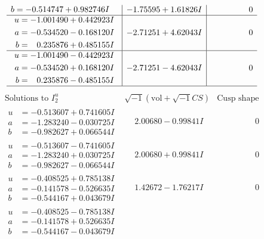 \documentclass[1p]{elsarticle_modified}
\theoremstyle{definition}
\newcommand{\I}{\sqrt{-1}}
\begin{document}
$$\begin{array}{c|c|c}
\begin{aligned}
b &= -0.514747 + 0.982746 I\end{aligned}
 & -1.75595 + 1.61826 I & \phantom{-0.000000 } 0 \\ \hline\begin{aligned}
u &= -1.001490 + 0.442923 I \\
a &= -0.534520 - 0.168120 I \\
b &= \phantom{-}0.235876 + 0.485155 I\end{aligned}
 & -2.71251 + 4.62043 I & \phantom{-0.000000 } 0 \\ \hline\begin{aligned}
u &= -1.001490 - 0.442923 I \\
a &= -0.534520 + 0.168120 I \\
b &= \phantom{-}0.235876 - 0.485155 I\end{aligned}
 & -2.71251 - 4.62043 I & \phantom{-0.000000 } 0\\
 \hline 
 \end{array}$$\newpage$$\begin{array}{c|c|c}  
\text{Solutions to }I^u_{2}& \I (\text{vol} + \sqrt{-1}CS) & \text{Cusp shape}\\
 \hline 
\begin{aligned}
u &= -0.513607 + 0.741605 I \\
a &= -1.283240 - 0.030725 I \\
b &= -0.982627 + 0.066544 I\end{aligned}
 & \phantom{-}2.00680 - 0.99841 I & \phantom{-0.000000 } 0 \\ \hline\begin{aligned}
u &= -0.513607 - 0.741605 I \\
a &= -1.283240 + 0.030725 I \\
b &= -0.982627 - 0.066544 I\end{aligned}
 & \phantom{-}2.00680 + 0.99841 I & \phantom{-0.000000 } 0 \\ \hline\begin{aligned}
u &= -0.408525 + 0.785138 I \\
a &= -0.141578 - 0.526635 I \\
b &= -0.544167 + 0.043679 I\end{aligned}
 & \phantom{-}1.42672 - 1.76217 I & \phantom{-0.000000 } 0 \\ \hline\begin{aligned}
u &= -0.408525 - 0.785138 I \\
a &= -0.141578 + 0.526635 I \\
b &= -0.544167 - 0.043679 I\end{aligned}

\end{array}$$
\end{document}
